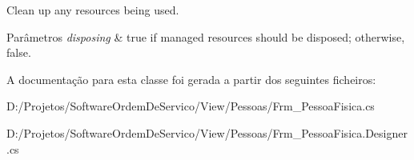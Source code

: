 Clean up any resources being used. 


\begin{DoxyParams}{Parâmetros}
{\em disposing} & true if managed resources should be disposed; otherwise, false.\\
\hline
\end{DoxyParams}


A documentação para esta classe foi gerada a partir dos seguintes ficheiros\+:\begin{DoxyCompactItemize}
\item 
D\+:/\+Projetos/\+Software\+Ordem\+De\+Servico/\+View/\+Pessoas/Frm\+\_\+\+Pessoa\+Fisica.\+cs\item 
D\+:/\+Projetos/\+Software\+Ordem\+De\+Servico/\+View/\+Pessoas/Frm\+\_\+\+Pessoa\+Fisica.\+Designer.\+cs\end{DoxyCompactItemize}
